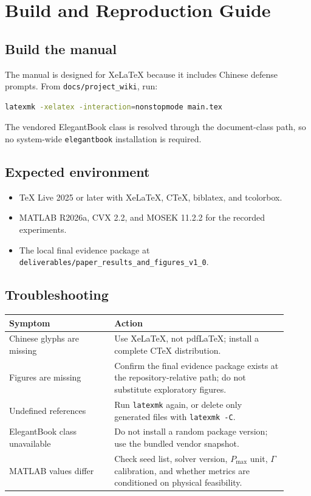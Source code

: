 \chapter{Build and Reproduction Guide}

\section{Build the manual}
The manual is designed for XeLaTeX because it includes Chinese defense prompts.
From \texttt{docs/project\_wiki}, run:
\begin{lstlisting}[language=bash]
latexmk -xelatex -interaction=nonstopmode main.tex
\end{lstlisting}
The vendored ElegantBook class is resolved through the document-class path, so
no system-wide \texttt{elegantbook} installation is required.

\section{Expected environment}
\begin{itemize}
\item TeX Live 2025 or later with XeLaTeX, CTeX, biblatex, and tcolorbox.
\item MATLAB R2026a, CVX 2.2, and MOSEK 11.2.2 for the recorded experiments.
\item The local final evidence package at
\texttt{deliverables/paper\_results\_and\_figures\_v1\_0}.
\end{itemize}

\section{Troubleshooting}
\begin{longtable}{p{0.34\linewidth}p{0.57\linewidth}}
\toprule
Symptom & Action\\ \midrule
Chinese glyphs are missing & Use XeLaTeX, not pdfLaTeX; install a complete CTeX distribution.\\
Figures are missing & Confirm the final evidence package exists at the repository-relative path; do not substitute exploratory figures.\\
Undefined references & Run \texttt{latexmk} again, or delete only generated files with \texttt{latexmk -C}.\\
ElegantBook class unavailable & Do not install a random package version; use the bundled vendor snapshot.\\
MATLAB values differ & Check seed list, solver version, $P_{\max}$ unit, $\Gamma$ calibration, and whether metrics are conditioned on physical feasibility.\\
\bottomrule
\end{longtable}

